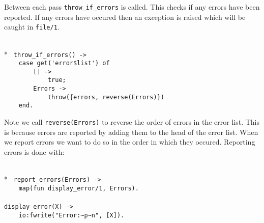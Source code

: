   Between each pass  \verb+throw_if_errors+ is called.  This checks if
any errors have been reported.   If any errors   have occured then  an
exception is raised which will be caught in \verb+file/1+.

\begin{flushleft}
\label{error handling_3_5}
\\*
\tt
\noindent{}%
\verb&throw_if_errors() ->&\\
\noindent{}%
\verb&    case get('error$list') of&\\
\noindent{}%
\verb&        [] ->&\\
\noindent{}%
\verb&            true;&\\
\noindent{}%
\verb&        Errors ->&\\
\noindent{}%
\verb&            throw({errors, reverse(Errors)})&\\
\noindent{}%
\verb&    end.&\\
\end{flushleft}

  Note  we call \verb+reverse(Errors)+  to reverse the order of errors
in the error list.  This is because errors are reported by adding them
to the head of the error list. When we report  errors we want to do so
in the order in which they occured. Reporting errors is done with:

\begin{flushleft}
\label{error handling_4_5}
\\*
\tt
\noindent{}%
\verb&report_errors(Errors) ->&\\
\noindent{}%
\verb&    map(fun display_error/1, Errors).&\\
\noindent{}%
\verb&&\\
\noindent{}%
\verb&display_error(X) ->&\\
\noindent{}%
\verb&    io:fwrite("Error:~p~n", [X]).&\\
\end{flushleft}

